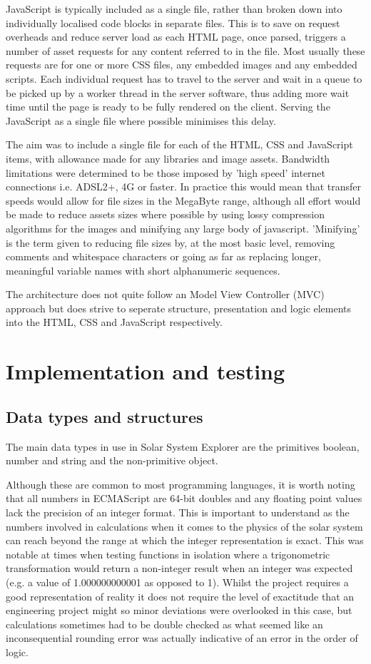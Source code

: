 \documentclass[twoside]{bhamthesis}
\begin{document}
JavaScript is typically included as a single file, rather than broken down into individually localised code blocks in separate files. This is to save on request overheads and reduce server load as each HTML page, once parsed, triggers a number of asset requests for any content referred to in the file. Most usually these requests are for one or more CSS files, any embedded images and any embedded scripts. Each individual request has to travel to the server and wait in a queue to be picked up by a worker thread in the server software, thus adding more wait time until the page is ready to be fully rendered on the client. Serving the JavaScript as a single file where possible minimises this delay.

The aim was to include a single file for each of the HTML, CSS and JavaScript items, with allowance made for any libraries and image assets. Bandwidth limitations were determined to be those imposed by 'high speed' internet connections i.e. ADSL2+, 4G or faster. In practice this would mean that transfer speeds would allow for file sizes in the MegaByte range, although all effort would be made to reduce assets sizes where possible by using lossy compression algorithms for the images and minifying any large body of javascript. 'Minifying' is the term given to reducing file sizes by, at the most basic level, removing comments and whitespace characters or going as far as replacing longer, meaningful variable names with short alphanumeric sequences.

The architecture does not quite follow an Model View Controller (MVC) approach but does strive to seperate structure, presentation and logic elements into the HTML, CSS and JavaScript respectively.

\section{Implementation and testing}

\subsection{Data types and structures}
The main data types in use in Solar System Explorer are the primitives boolean, number and string and the non-primitive object.

Although these are common to most programming languages, it is worth noting that all numbers in ECMAScript are 64-bit doubles and any floating point values lack the precision of an integer format. This is important to understand as the numbers involved in calculations when it comes to the physics of the solar system can reach beyond the range at which the integer representation is exact. This was notable at times when testing functions in isolation where a trigonometric transformation would return a non-integer result when an integer was expected (e.g. a value of 1.000000000001 as opposed to 1).  Whilst the project requires a good representation of reality it does not require the level of exactitude that an engineering project might so minor deviations were overlooked in this case, but calculations sometimes had to be double checked as what seemed like an inconsequential rounding error was actually  indicative of an error in the order of logic.
\end{document}
